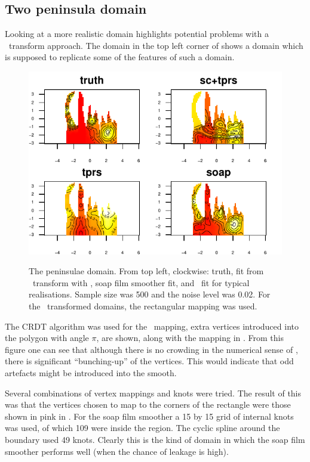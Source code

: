 \subsection{Two peninsula domain}

Looking at a more realistic domain highlights potential problems with a \sch\ transform approach. The domain in the top left corner of  shows a domain which is supposed to replicate some of the features of such a domain.

\begin{figure}
\centering
\includegraphics[width=6in]{sc/figs/wigglytop2-real.pdf} \\
\caption{The peninsulae domain. From top left, clockwise: truth, fit from \sch\ transform with \tprs, soap film smoother fit, and \tprs\ fit for typical realisations. Sample size was 500 and the noise level was 0.02. For the \sch\ transformed domains, the rectangular mapping was used.}
\label{sc-wigglytop2-real}
\end{figure}

The CRDT algorithm was used for the \sch\ mapping, extra vertices introduced into the polygon with angle $\pi$, are shown, along with the mapping in . From this figure one can see that although there is no crowding in the numerical sense of , there is significant ``bunching-up'' of the vertices. This would indicate that odd artefacts might be introduced into the smooth.

Several combinations of vertex mappings and knots were tried. The result of this was that the vertices chosen to map to the corners of the rectangle were those shown in pink in . For the soap film smoother a 15 by 15 grid of internal knots was used, of which 109 were inside the region. The cyclic spline around the boundary used 49 knots. Clearly this is the kind of domain in which the soap film smoother performs well (when the chance of leakage is high).

